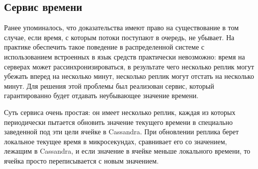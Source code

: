 \subsection{Сервис времени}

Ранее упоминалось, что доказательства имеют право на существование в том случае, если время, с которым потоки поступают в очередь, не убывает. На практике обеспечить такое поведение в распределенной системе с использованием встроенных в язык средств практически невозможно: время на серверах может рассинхронизироваться, в результате чего несколько реплик могут убежать вперед на несколько минут, несколько реплик могут отстать на несколько минут. Для решения этой проблемы был реализован сервис, который гарантированно будет отдавать неубывающее значение времени.

Суть сервиса очень простая: он имеет несколько реплик, каждая из которых периодически пытается обновить значение текущего времени в специально заведенной под эти цели ячейке в Cassandra. При обновлении реплика берет локальное текущее время в микросекундах, сравнивает его со значением, лежащим в Cassandra, и если значение в ячейке меньше локального времени, то ячейка просто переписывается с новым значением.